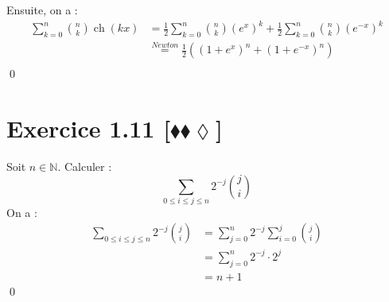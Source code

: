 \documentclass[10pt]{article}
\DeclareMathOperator{\ch}{ch}
\begin{document}
\begin{tcolorbox}[enhanced, width=7in, center, size=fbox, fontupper=\large, drop shadow southwest]
    Ensuite, on a :
    \begin{align*}
        \sum\limits^{n}_{k=0}{\binom{n}{k}\ch(kx)}&=\frac{1}{2}\sum\limits^{n}_{k=0}{\binom{n}{k}(e^x)^k+\frac{1}{2}\sum\limits^{n}_{k=0}{\binom{n}{k}{(e^{-x})^k}}}\\
        &\stackrel{Newton}{=}\frac{1}{2}\left((1+e^x)^n+(1+e^{-x})^n\right)\\
    \end{align*}
    \qed
\end{tcolorbox}


\section*{Exercice 1.11 [$\blacklozenge\blacklozenge\lozenge$]}
\begin{tcolorbox}[enhanced, width=7in, center, size=fbox, fontupper=\large, drop shadow southwest]
    Soit $n\in\mathbb{N}$. Calculer :
    \begin{equation*}
        \sum\limits_{0\leq{i}\leq{j}\leq{n}}{2^{-j}\binom{j}{i}}
    \end{equation*}
    On a :
    \begin{align*}
        \sum\limits_{0\leq{i}\leq{j}\leq{n}}{2^{-j}\binom{j}{i}}
        &=\sum\limits^{n}_{j=0}{2^{-j}\sum\limits^{j}_{i=0}{\binom{j}{i}}}\\
        &=\sum\limits^{n}_{j=0}{2^{-j}\cdot2^j}\\
        &=n+1
    \end{align*}
    \qed
\end{tcolorbox}
\end{document}
